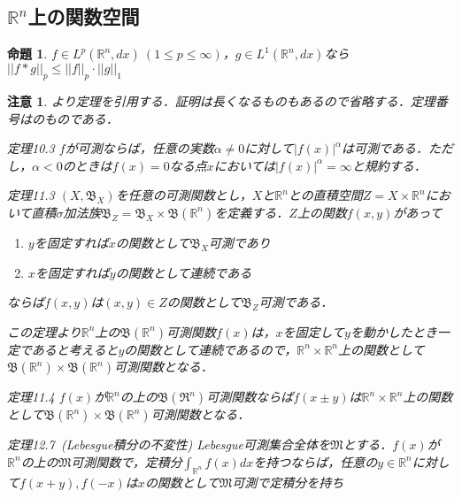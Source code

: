 \documentclass[a4paper,11pt]{jsarticle}
\newtheorem{prop}[definition]{命題}
\newtheorem{attention}{注意}
\begin{document}
\subsection{$\mathbb{R}^n$上の関数空間}
\setcounter{definition}{20}
\begin{prop}
$f\in L^p(\mathbb{R}^n,dx){\ }(1\leq p\leq \infty)$，$g\in L^1(\mathbb{R}^n,dx)$なら$||f\ast g||_p\leq ||f||_p\cdot ||g||_1$
\end{prop}
\begin{attention}
\cite{ito}より定理を引用する．証明は長くなるものもあるので省略する．定理番号は\cite{ito}のものである．
\begin{itembox}[l]{定理10.3}
$f$が可測ならば，任意の実数$\alpha\neq 0$に対して$|f(x)|^\alpha$は可測である．ただし，$\alpha<0$のときは$f(x)=0$なる点$x$においては$|f(x)|^\alpha=\infty$と規約する．
\end{itembox}
\begin{itembox}[l]{定理11.3}
$(X,\mathfrak{B}_X)$を任意の可測関数とし，$X$と$\mathbb{R}^n$との直積空間$Z=X\times\mathbb{R}^n$において直積$\sigma$加法族$\mathfrak{B}_Z=\mathfrak{B}_X\times\mathfrak{B}(\mathbb{R}^n)$を定義する．$Z$上の関数$f(x,y)$があって
\begin{enumerate}
\renewcommand{\labelenumi}{(\roman{enumi})}
\item $y$を固定すれば$x$の関数として$\mathfrak{B}_X$可測であり
\item $x$を固定すれば$y$の関数として連続である
\end{enumerate}
ならば$f(x,y)$は$(x,y)\in Z$の関数として$\mathfrak{B}_Z$可測である．
\end{itembox}
この定理より$\mathbb{R}^n$上の$\mathfrak{B}(\mathbb{R}^n)$可測関数$f(x)$は，$x$を固定して$y$を動かしたとき一定であると考えると$y$の関数として連続であるので，$\mathbb{R}^n\times\mathbb{R}^n$上の関数として$\mathfrak{B}(\mathbb{R}^n)\times\mathfrak{B}(\mathbb{R}^n)$可測関数となる．
\begin{itembox}[l]{定理11.4}
$f(x)$が$\mathbb{R}^n$の上の$\mathfrak{B}(\mathfrak{R}^n)$可測関数ならば$f(x\pm y)$は$\mathbb{R}^n\times\mathbb{R}^n$上の関数として$\mathfrak{B}(\mathbb{R}^n)\times\mathfrak{B}(\mathbb{R}^n)$可測関数となる．
\end{itembox}
\begin{itembox}[l]{定理12.7{\ }(Lebesgue積分の不変性)}
Lebesgue可測集合全体を$\mathfrak{M}$とする．$f(x)$が$\mathbb{R}^n$の上の$\mathfrak{M}$可測関数で，定積分$\int_{\mathbb{R}^n}f(x)dx$を持つならば，任意の$y\in\mathbb{R}^n$に対して$f(x+y),f(-x)$は$x$の関数として$\mathfrak{M}$可測で定積分を持ち

\end{itembox}
\end{attention}
\end{document}
